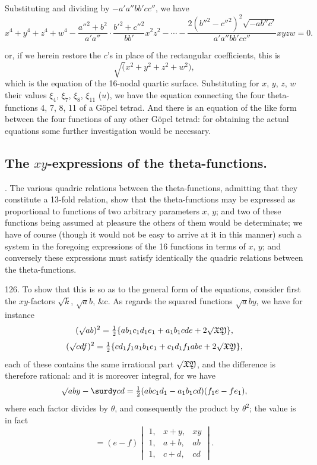 \documentclass[11pt,a4paper]{book}
\begin{document}
Substituting and dividing by $-a'a''bb'cc''$, we have
\[
x^4 + y^4 + z^4 + w^4 - \frac{a''^2 + b^2}{a'a''} \cdot \frac{b'^2 + c''^2}{bb'}x^2z^2 - \cdots - \frac{2(b''^2 - c''^2)^2\sqrt{-ab''c'}}{a'a''bb'cc''}xyzw = 0.
\]
\clearpage


\setcounter{page}{551}

\noindent
or, if we herein restore the $c$'s in place of the rectangular coefficients, this is
\[
\surd(x^2 + y^2 + z^2 + w^2),
\]
which is the equation of the 16-nodal quartic surface. Substituting for $x$, $y$, $z$, $w$ their values $\xi_4$, $\xi_7$, $\xi_8$, $\xi_{11}$ ($u$), we have the equation connecting the four theta-functions 4, 7, 8, 11 of a G\"opel tetrad. And there is an equation of the like form between the four functions of any other G\"opel tetrad: for obtaining the actual equations some further investigation would be necessary.

\subsection*{The $xy$-expressions of the theta-functions.}

. The various quadric relations between the theta-functions, admitting that they constitute a 13-fold relation, show that the theta-functions may be expressed as proportional to functions of two arbitrary parameters $x$, $y$; and two of these functions being assumed at pleasure the others of them would be determinate; we have of course (though it would not be easy to arrive at it in this manner) such a system in the foregoing expressions of the 16 functions in terms of $x$, $y$; and conversely these expressions must satisfy identically the quadric relations between the theta-functions.

126. To show that this is so as to the general form of the equations, consider first the $xy$-factors $\surd k$, $\surd ab$, \&c. As regards the squared functions $\surd aby$, we have for instance
\[
(\surd ab)^2 = \tfrac12 \{ab_1 c_1 d_1 e_1 + a_1 b_1 cde + 2\surd\mathfrak{XY}\},
\]
\[
(\surd cdf)^2 = \tfrac12 \{cd_1 f_1 a_1 b_1 e_1 + c_1 d_1 f_1 abe + 2\surd\mathfrak{XY}\},
\]
each of these contains the same irrational part $\surd\mathfrak{XY}$, and the difference is therefore rational: and it is moreover integral, for we have
\[
\surd aby - \surdy cd = \tfrac12 (abc_1 d_1 - a_1 b_1 cd)(f_1 e - f e_1),
\]
where each factor divides by $\theta$, and consequently the product by $\theta^2$; the value is in fact
\[
= (e - f)
\begin{vmatrix}
1, & x + y, & xy \\
1, & a + b, & ab \\
1, & c + d, & cd
\end{vmatrix}.
\]
\end{document}
